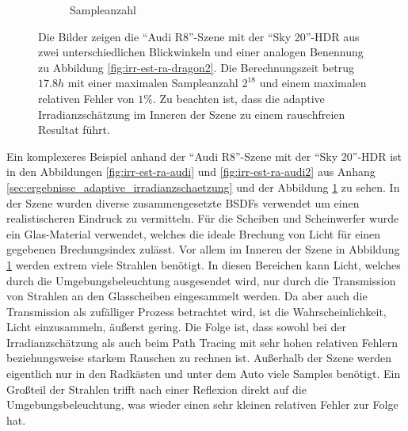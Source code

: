 \begin{figure}[h]
\begin{subfigure}[t]{0.5\textwidth}
				\caption{Sampleanzahl}
			\end{subfigure}
			\caption[Adaptive Vertex-Irradiance-Map anhand der \enquote{Audi R8}-Szene]{Die Bilder zeigen die \enquote{Audi R8}-Szene mit der \enquote{Sky 20}-HDR aus zwei unterschiedlichen Blickwinkeln und einer analogen Benennung zu Abbildung \ref{fig:irr-est-ra-dragon2}. Die Berechnungszeit betrug $17.8\unit{h}$ mit einer maximalen Sampleanzahl $2^{18}$ und einem maximalen relativen Fehler von $1\unit{\%}$. Zu beachten ist, dass die adaptive Irradianzschätzung im Inneren der Szene zu einem rauschfreien Resultat führt.}
			\label{fig:irr-est-ra-audi3}
		\end{figure}

		\FloatBarrier

		Ein komplexeres Beispiel anhand der \enquote{Audi R8}-Szene mit der \enquote{Sky 20}-HDR ist in den Abbildungen \ref{fig:irr-est-ra-audi} und \ref{fig:irr-est-ra-audi2} aus Anhang \ref{sec:ergebnisse_adaptive_irradianzschaetzung} und der Abbildung \ref{fig:irr-est-ra-audi3} zu sehen.
		In der Szene wurden diverse zusammengesetzte BSDFs verwendet um einen realistischeren Eindruck zu vermitteln.
		Für die Scheiben und Scheinwerfer wurde ein Glas-Material verwendet, welches die ideale Brechung von Licht für einen gegebenen Brechungsindex zulässt.
		Vor allem im Inneren der Szene in Abbildung \ref{fig:irr-est-ra-audi3} werden extrem viele Strahlen benötigt.
		In diesen Bereichen kann Licht, welches durch die Umgebungsbeleuchtung ausgesendet wird, nur durch die Transmission von Strahlen an den Glasscheiben eingesammelt werden.
		Da aber auch die Transmission als zufälliger Prozess betrachtet wird, ist die Wahrscheinlichkeit, Licht einzusammeln, äußerst gering.
		Die Folge ist, dass sowohl bei der Irradianzschätzung als auch beim Path Tracing mit sehr hohen relativen Fehlern beziehungsweise starkem Rauschen zu rechnen ist.
		Außerhalb der Szene werden eigentlich nur in den Radkästen und unter dem Auto viele Samples benötigt.
		Ein Großteil der Strahlen trifft nach einer Reflexion direkt auf die Umgebungsbeleuchtung, was wieder einen sehr kleinen relativen Fehler zur Folge hat.

